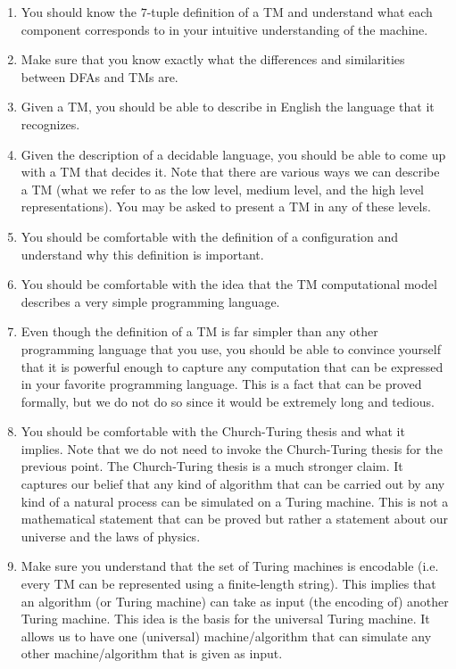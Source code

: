\begin{enumerate}
    \item You should know the $7$-tuple definition of a TM and understand what each component corresponds to in your intuitive understanding of the machine. 
    \item Make sure that you know exactly what the differences and similarities between DFAs and TMs are.
    \item Given a TM, you should be able to describe in English the language that it recognizes.
    \item Given the description of a decidable language, you should be able to come up with a TM that decides it. Note that there are various ways we can describe a TM (what we refer to as the low level, medium level, and the high level representations). You may be asked to present a TM in any of these levels.
    \item You should be comfortable with the definition of a configuration and understand why this definition is important.
    \item You should be comfortable with the idea that the TM computational model describes a very simple programming language.
    \item Even though the definition of a TM is far simpler than any other programming language that you use, you should be able to convince yourself that it is powerful enough to capture any computation that can be expressed in your favorite programming language. This is a fact that can be proved formally, but we do not do so since it would be extremely long and tedious.
    \item You should be comfortable with the Church-Turing thesis and what it implies. Note that we do not need to invoke the Church-Turing thesis for the previous point. The Church-Turing thesis is a much stronger claim. It captures our belief that any kind of algorithm that can be carried out by any kind of a natural process can be simulated on a Turing machine. This is not a mathematical statement that can be proved but rather a statement about our universe and the laws of physics. 
    \item Make sure you understand that the set of Turing machines is encodable (i.e. every TM can be represented using a finite-length string). This implies that an algorithm (or Turing machine) can take as input (the encoding of) another Turing machine. This idea is the basis for the universal Turing machine. It allows us to have one (universal) machine/algorithm that can simulate any other machine/algorithm that is given as input.

\end{enumerate}
